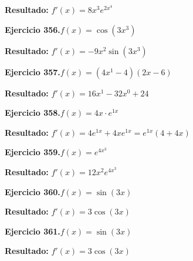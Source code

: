 \documentclass[10pt,a4paper]{article}
\begin{document}
\begin{solbox}
\textbf{Resultado:} \(\displaystyle f'(x) = 8x^{3}e^{2x^{4}}\)
\end{solbox}

\begin{ejbox}
\textbf{Ejercicio 356.}\quad $f(x) = \cos(3x^{3})$
\end{ejbox}

\begin{solbox}
\textbf{Resultado:} \(\displaystyle f'(x) = -9x^{2}\sin(3x^{3})\)
\end{solbox}

\begin{ejbox}
\textbf{Ejercicio 357.}\quad $f(x) = (4x^{1} -4)(2x -6)$
\end{ejbox}

\begin{solbox}
\textbf{Resultado:} \(\displaystyle f'(x) = 16x^{1} -32x^{0} +24\)
\end{solbox}

\newpage
\begin{ejbox}
\textbf{Ejercicio 358.}\quad $f(x) = 4x \cdot e^{1x}$
\end{ejbox}

\begin{solbox}
\textbf{Resultado:} \(\displaystyle f'(x) = 4e^{1x} + 4xe^{1x} = e^{1x}(4 + 4x)\)
\end{solbox}

\begin{ejbox}
\textbf{Ejercicio 359.}\quad $f(x) = e^{4x^{3}}$
\end{ejbox}

\begin{solbox}
\textbf{Resultado:} \(\displaystyle f'(x) = 12x^{2}e^{4x^{3}}\)
\end{solbox}

\begin{ejbox}
\textbf{Ejercicio 360.}\quad $f(x) = \sin(3x)$
\end{ejbox}

\begin{solbox}
\textbf{Resultado:} \(\displaystyle f'(x) = 3\cos(3x)\)
\end{solbox}

\newpage
\begin{ejbox}
\textbf{Ejercicio 361.}\quad $f(x) = \sin(3x)$
\end{ejbox}

\begin{solbox}
\textbf{Resultado:} \(\displaystyle f'(x) = 3\cos(3x)\)
\end{solbox}
\end{document}

